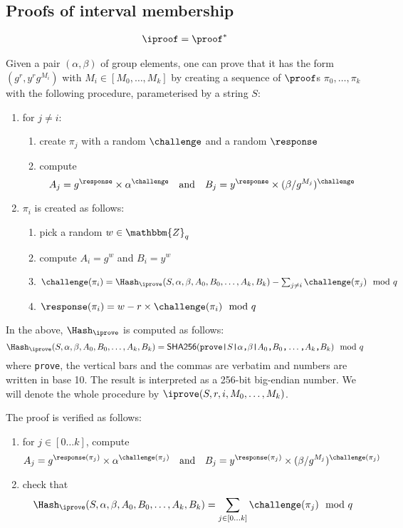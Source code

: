 \documentclass[a4paper]{article}
\newcommand{\Z}{\mathbbm{Z}}
\newcommand{\shatwo}{\textsf{SHA256}}
\begin{document}
\subsection{Proofs of interval membership}
\label{iproof}

\begin{gather*}
  \iproof=\proof^\ast
\end{gather*}

Given a pair $(\alpha,\beta)$ of group elements, one can prove that it
has the form $(g^r,y^rg^{M_i})$ with $M_i\in[M_0,\dots,M_k]$ by
creating a sequence of $\proof$s $\pi_0,\dots,\pi_k$ with the
following procedure, parameterised by a string $S$:
\begin{enumerate}
\item for $j\neq i$:
  \begin{enumerate}
  \item create $\pi_j$ with a random $\challenge$ and a random
    $\response$
  \item compute
    \[A_j={g^\response}\times{\alpha^\challenge}\quad\text{and}\quad
    B_j={y^\response}\times{(\beta/g^{M_j})^\challenge}\]
  \end{enumerate}
\item $\pi_i$ is created as follows:
  \begin{enumerate}
  \item pick a random $w\in\Z_q$
  \item compute $A_i=g^w$ and $B_i=y^w$
  \item $\challenge(\pi_i)=\Hash_\iprove(S,\alpha,\beta,A_0,B_0,\dots,A_k,B_k)-\sum_{j\neq
      i}\challenge(\pi_j)\mod q$
  \item $\response(\pi_i)=w-r\times\challenge(\pi_i)\mod q$
  \end{enumerate}
\end{enumerate}
In the above, $\Hash_\iprove$ is computed as follows:
\[\Hash_\iprove(S,\alpha,\beta,A_0,B_0,\dots,A_k,B_k)=\shatwo(\verb=prove|=S\verb=|=\alpha\verb=,=\beta\verb=|=A_0\verb=,=B_0\verb=,=\dots\verb=,=A_k\verb=,=B_k)\mod q\]
where \verb=prove=, the vertical bars and the commas are verbatim and
numbers are written in base 10. The result is interpreted as a 256-bit
big-endian number. We will denote the whole procedure by
$\iprove(S,r,i,M_0,\dots,M_k)$.

The proof is verified as follows:
\begin{enumerate}
\item for $j\in[0\dots k]$, compute
  \[A_j={g^{\response(\pi_j)}}\times{\alpha^{\challenge(\pi_j)}}\quad\text{and}\quad
  B_j={y^{\response(\pi_j)}}\times{(\beta/g^{M_j})^{\challenge(\pi_j)}}\]
\item check that
  \[\Hash_\iprove(S,\alpha,\beta,A_0,B_0,\dots,A_k,B_k)=\sum_{j\in[0\dots
    k]}\challenge(\pi_j)\mod q\]
\end{enumerate}
\end{document}
